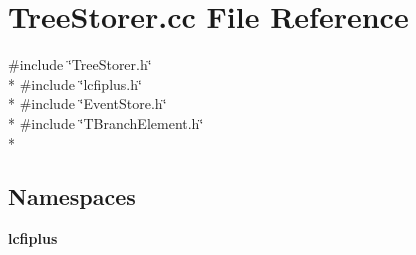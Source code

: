 \section{Tree\-Storer.\-cc File Reference}
\label{TreeStorer_8cc}
{\ttfamily \#include \char`\"{}Tree\-Storer.\-h\char`\"{}}\\*
{\ttfamily \#include \char`\"{}lcfiplus.\-h\char`\"{}}\\*
{\ttfamily \#include \char`\"{}Event\-Store.\-h\char`\"{}}\\*
{\ttfamily \#include \char`\"{}T\-Branch\-Element.\-h\char`\"{}}\\*
\subsection*{Namespaces}
\begin{DoxyCompactItemize}
\item 
{\bf lcfiplus}
\end{DoxyCompactItemize}
